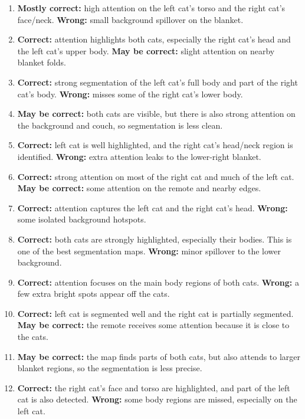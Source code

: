 \documentclass[10pt]{article}
\begin{document}
\begin{enumerate}[label=\arabic*.]
    \item \textbf{Mostly correct:} high attention on the left cat’s torso and the right cat’s face/neck. \textbf{Wrong:} small background spillover on the blanket.
    \item \textbf{Correct:} attention highlights both cats, especially the right cat’s head and the left cat’s upper body. \textbf{May be correct:} slight attention on nearby blanket folds.
    \item \textbf{Correct:} strong segmentation of the left cat’s full body and part of the right cat’s body. \textbf{Wrong:} misses some of the right cat’s lower body.
    \item \textbf{May be correct:} both cats are visible, but there is also strong attention on the background and couch, so segmentation is less clean.
    \item \textbf{Correct:} left cat is well highlighted, and the right cat’s head/neck region is identified. \textbf{Wrong:} extra attention leaks to the lower-right blanket.
    \item \textbf{Correct:} strong attention on most of the right cat and much of the left cat. \textbf{May be correct:} some attention on the remote and nearby edges.
    \item \textbf{Correct:} attention captures the left cat and the right cat’s head. \textbf{Wrong:} some isolated background hotspots.
    \item \textbf{Correct:} both cats are strongly highlighted, especially their bodies. This is one of the best segmentation maps. \textbf{Wrong:} minor spillover to the lower background.
    \item \textbf{Correct:} attention focuses on the main body regions of both cats. \textbf{Wrong:} a few extra bright spots appear off the cats.
    \item \textbf{Correct:} left cat is segmented well and the right cat is partially segmented. \textbf{May be correct:} the remote receives some attention because it is close to the cats.
    \item \textbf{May be correct:} the map finds parts of both cats, but also attends to larger blanket regions, so the segmentation is less precise.
    \item \textbf{Correct:} the right cat’s face and torso are highlighted, and part of the left cat is also detected. \textbf{Wrong:} some body regions are missed, especially on the left cat.
\end{enumerate}
\end{document}
